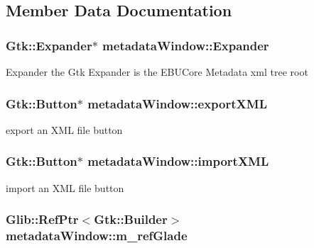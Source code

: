 \subsection{Member Data Documentation}
\hypertarget{classmetadataWindow_a3895713778e334a6a35167c68d64e8da}{
\subsubsection[{Expander}]{\setlength{\rightskip}{0pt plus 5cm}Gtk\-::\-Expander$\ast$ metadata\-Window\-::\-Expander\hspace{0.3cm}{\ttfamily [protected]}}}\label{classmetadataWindow_a3895713778e334a6a35167c68d64e8da}
Expander the Gtk Expander is the E\-B\-U\-Core Metadata xml tree root \hypertarget{classmetadataWindow_ab381aa9da2c3ed515ef75a4d11cb25fb}{
\subsubsection[{export\-X\-M\-L}]{\setlength{\rightskip}{0pt plus 5cm}Gtk\-::\-Button$\ast$ metadata\-Window\-::export\-X\-M\-L\hspace{0.3cm}{\ttfamily [protected]}}}\label{classmetadataWindow_ab381aa9da2c3ed515ef75a4d11cb25fb}
export an X\-M\-L file button \hypertarget{classmetadataWindow_a2051e409ea2938b18915e3d8f978df56}{
\subsubsection[{import\-X\-M\-L}]{\setlength{\rightskip}{0pt plus 5cm}Gtk\-::\-Button$\ast$ metadata\-Window\-::import\-X\-M\-L\hspace{0.3cm}{\ttfamily [protected]}}}\label{classmetadataWindow_a2051e409ea2938b18915e3d8f978df56}
import an X\-M\-L file button \hypertarget{classmetadataWindow_aafbb917d9e593dbbea0619d87bb7be7a}{
\subsubsection[{m\-\_\-ref\-Glade}]{\setlength{\rightskip}{0pt plus 5cm}Glib\-::\-Ref\-Ptr$<$Gtk\-::\-Builder$>$ metadata\-Window\-::m\-\_\-ref\-Glade\hspace{0.3cm}{\ttfamily [protected]}}}\label{classmetadataWindow_aafbb917d9e593dbbea0619d87bb7be7a}
